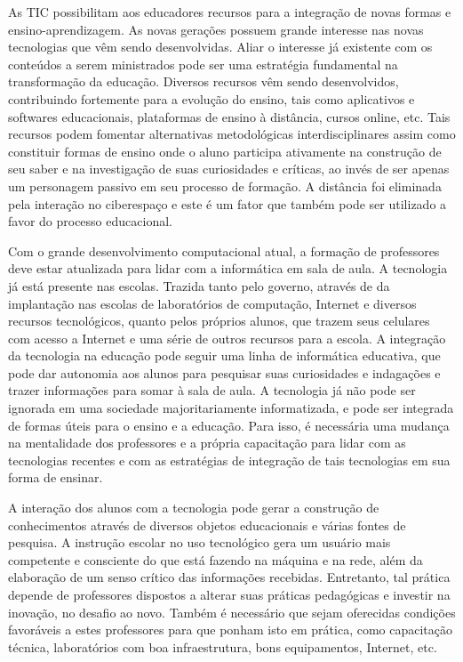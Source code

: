     
	As TIC possibilitam aos educadores recursos para a integração de novas formas e ensino-aprendizagem. As novas gerações possuem grande interesse nas novas tecnologias que vêm sendo desenvolvidas. Aliar o interesse já existente com os conteúdos a serem ministrados pode ser uma estratégia fundamental na transformação da educação. Diversos recursos vêm sendo desenvolvidos, contribuindo fortemente para a evolução do ensino, tais como aplicativos e softwares educacionais, plataformas de ensino à distância, cursos online, etc. Tais recursos podem fomentar alternativas metodológicas interdisciplinares assim como constituir formas de ensino onde o aluno participa ativamente na construção de seu saber e na investigação de suas curiosidades e críticas, ao invés de ser apenas um personagem passivo em seu processo de formação. 	A distância foi eliminada pela interação no ciberespaço e este é um fator que também pode ser utilizado a favor do processo educacional. 
    
    
	Com o grande desenvolvimento computacional atual, a formação de professores deve estar atualizada para lidar com a informática em sala de aula. A tecnologia já está presente nas escolas. Trazida tanto pelo governo, através de da implantação nas escolas de laboratórios de computação, Internet e diversos recursos tecnológicos, quanto pelos próprios alunos, que trazem seus celulares com acesso a Internet e uma série de outros recursos para a escola. A integração da tecnologia na educação pode seguir uma linha de informática educativa, que pode dar autonomia aos alunos para pesquisar suas curiosidades e indagações e trazer informações para somar à sala de aula. A tecnologia já não pode ser ignorada em uma sociedade majoritariamente informatizada, e pode ser integrada de formas úteis para o ensino e a educação. Para isso, é necessária uma mudança na mentalidade dos professores e a própria capacitação para lidar com as tecnologias recentes e com as estratégias de integração de tais tecnologias em sua forma de ensinar.
    
    
	A interação dos alunos com a tecnologia pode gerar a construção de conhecimentos através de diversos objetos educacionais e várias fontes de pesquisa. A instrução escolar no uso tecnológico gera um usuário mais competente e consciente do que está fazendo na máquina e na rede, além da elaboração de um senso crítico das informações recebidas. Entretanto, tal prática depende de professores dispostos a alterar suas práticas pedagógicas e investir na inovação, no desafio ao novo. Também é necessário que sejam oferecidas condições favoráveis a estes professores para que ponham isto em prática, como capacitação técnica, laboratórios com boa infraestrutura, bons equipamentos, Internet, etc.
    
